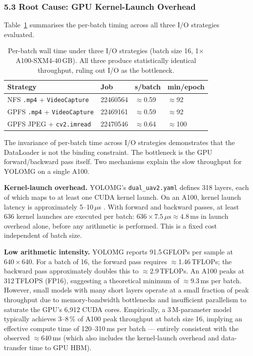 \subsubsection*{5.3 Root Cause: GPU Kernel-Launch Overhead}

Table~\ref{tab:io} summarises the per-batch timing across all three
I/O strategies evaluated.

\begin{table}[h]
\centering
\caption{Per-batch wall time under three I/O strategies (batch size 16,
         1$\times$A100-SXM4-40\,GB). All three produce statistically
         identical throughput, ruling out I/O as the bottleneck.}
\label{tab:io}
\begin{tabular}{llll}
\hline
\textbf{Strategy} & \textbf{Job} & \textbf{s/batch} & \textbf{min/epoch} \\
\hline
NFS \texttt{.mp4} + \texttt{VideoCapture}  & 22460564 & $\approx$0.59 & $\approx$92 \\
GPFS \texttt{.mp4} + \texttt{VideoCapture} & 22469161 & $\approx$0.59 & $\approx$92 \\
GPFS JPEG + \texttt{cv2.imread}            & 22470546 & $\approx$0.64 & $\approx$100 \\
\hline
\end{tabular}
\end{table}

\noindent The invariance of per-batch time across I/O strategies
demonstrates that the DataLoader is not the binding constraint.
The bottleneck is the GPU forward/backward pass itself. Two
mechanisms explain the slow throughput for YOLOMG on a single A100.

\textbf{Kernel-launch overhead.} YOLOMG's \texttt{dual\_uav2.yaml}
defines 318 layers, each of which maps to at least one CUDA kernel
launch. On an A100, kernel launch latency is approximately
5--10\,$\mu$s \cite{jia2018dissecting}. With forward and backward
passes, at least 636 kernel launches are executed per batch:
$636 \times 7.5\,\mu\text{s} \approx 4.8\,\text{ms}$ in launch
overhead alone, before any arithmetic is performed. This is a fixed
cost independent of batch size.

\textbf{Low arithmetic intensity.} YOLOMG reports 91.5\,GFLOPs per
sample at $640\times640$. For a batch of 16, the forward pass
requires $\approx$1.46\,TFLOPs; the backward pass approximately
doubles this to $\approx$2.9\,TFLOPs. An A100 peaks at
312\,TFLOPS (FP16), suggesting a theoretical minimum of
$\approx$9.3\,ms per batch. However, small models with many
short layers operate at a small fraction of peak throughput due
to memory-bandwidth bottlenecks and insufficient parallelism to
saturate the GPU's 6,912 CUDA cores. Empirically, a 3\,M-parameter
model typically achieves 3--8\,\% of A100 peak throughput at
batch size 16, implying an effective compute time of
120--310\,ms per batch — entirely consistent with the observed
$\approx$640\,ms (which also includes the kernel-launch overhead
and data-transfer time to GPU HBM).


